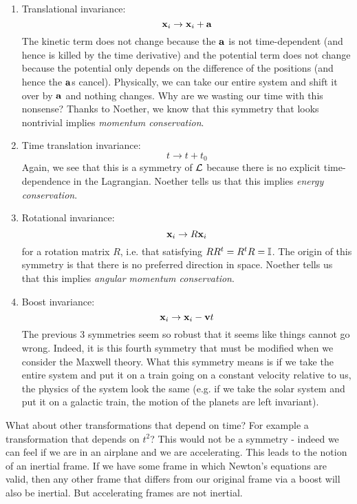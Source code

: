 \begin{enumerate}
    \item Translational invariance:
    \begin{equation}
        \mathbf{x}_i \to \mathbf{x}_i + \mathbf{a}
    \end{equation}
    The kinetic term does not change because the $\mathbf{a}$ is not time-dependent (and hence is killed by the time derivative) and the potential term does not change because the potential only depends on the difference of the positions (and hence the $\mathbf{a}$s cancel). Physically, we can take our entire system and shift it over by $\mathbf{a}$ and nothing changes. Why are we wasting our time with this nonsense? Thanks to Noether, we know that this symmetry that looks nontrivial implies \emph{momentum conservation}.
    \item Time translation invariance:
    \begin{equation}
        t \to t + t_0
    \end{equation}
    Again, we see that this is a symmetry of $\mathcal{L}$ because there is no explicit time-dependence in the Lagrangian. Noether tells us that this implies \emph{energy conservation}.
    \item Rotational invariance:
    \begin{equation}
        \mathbf{x}_i \to R\mathbf{x}_i
    \end{equation}
    for a rotation matrix $R$, i.e. that satisfying $RR^t = R^tR = \mathbb{I}$. The origin of this symmetry is that there is no preferred direction in space. Noether tells us that this implies \emph{angular momentum conservation}.
    \item Boost invariance:
    \begin{equation}
        \mathbf{x}_i \to \mathbf{x}_i - \mathbf{v}t
    \end{equation}
    The previous 3 symmetries seem so robust that it seems like things cannot go wrong. Indeed, it is this fourth symmetry that must be modified when we consider the Maxwell theory. What this symmetry means is if we take the entire system and put it on a train going on a constant velocity relative to us, the physics of the system look the same (e.g. if we take the solar system and put it on a galactic train, the motion of the planets are left invariant).
\end{enumerate}
What about other transformations that depend on time? For example a transformation that depends on $t^2$? This would not be a symmetry - indeed we can feel if we are in an airplane and we are accelerating. This leads to the notion of an inertial frame. If we have some frame in which Newton's equations are valid, then any other frame that differs from our original frame via a boost will also be inertial. But accelerating frames are not inertial.

